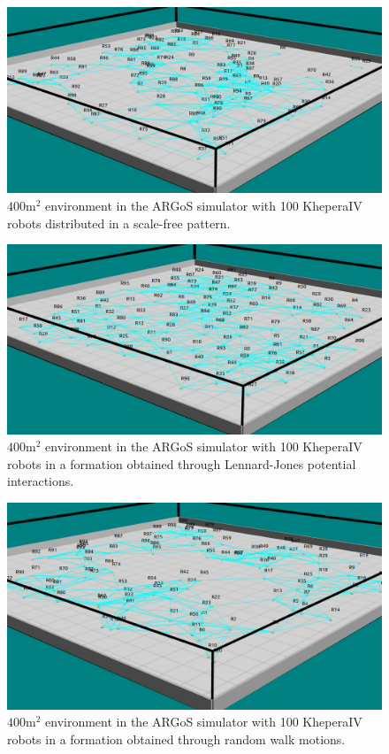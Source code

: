 \begin{figure}[htbp]
	\centering
    \includegraphics[width=\columnwidth]{figures/dora_mesh/argos_scale_free.png}
    \caption[Scale-free formation in ARGoS]{$400 \text{m}^2$ environment in the ARGoS simulator with 100 KheperaIV robots distributed in a scale-free pattern.}
    \label{argos:scale-free}
\end{figure}

\begin{figure}[htbp]
	\centering
    \includegraphics[width=\columnwidth]{figures/dora_mesh/argos_lennard.png}
    \caption[Lennard-Jones potential formation in ARGoS]{$400 \text{m}^2$ environment in the ARGoS simulator with 100 KheperaIV robots in a formation obtained through Lennard-Jones potential interactions.}
    \label{argos:lennard-jones}
\end{figure}

\begin{figure}[htbp]
	\centering
    \includegraphics[width=\columnwidth]{figures/dora_mesh/argos_random.png}
    \caption[Random formation in ARGoS]{$400 \text{m}^2$ environment in the ARGoS simulator with 100 KheperaIV robots in a formation obtained through random walk motions.}
    \label{argos:random-walk}
\end{figure}

